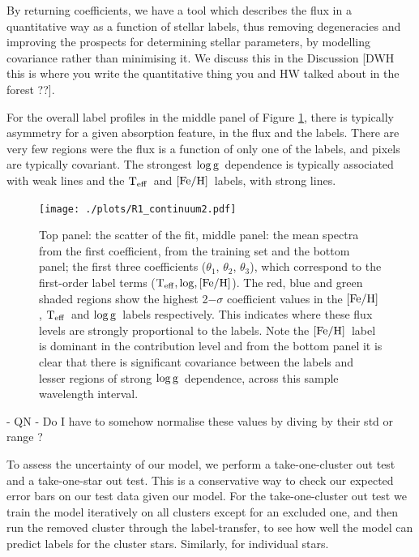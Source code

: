 \documentclass[12pt, preprint]{aastex}
\newcommand{\teff}{\mbox{$\rm T_{eff}$}}
\newcommand{\feh}{\mbox{$\rm [Fe/H]$}}
\newcommand{\logg}{\mbox{$\rm \log g$}}
\begin{document}
By returning coefficients, we have a tool which describes the flux in a quantitative way as a function of stellar labels, thus removing degeneracies and improving the prospects for determining stellar parameters, by modelling covariance rather than minimising it. We discuss this in the Discussion [DWH this is where you write the quantitative thing you and HW talked about in the forest ??].

For the overall label profiles in the middle panel of Figure \ref{fig:coeffs}, there is typically asymmetry for a given absorption feature, in the flux and the labels. There are very few regions were the flux is a function of only one of the labels, and pixels are typically covariant. The strongest \logg\ dependence is typically associated with weak lines and the \teff\ and \feh\ labels, with strong lines. 

 
\begin{figure}[h!]
    \texttt{[image: ./plots/R1\_continuum2.pdf]}
  \caption{Top panel: the scatter of the fit, middle panel: the mean spectra from the first coefficient, from the training set and the bottom panel; the first three coefficients ($\theta_1$, $\theta_2$, $\theta_3$),  which correspond to the first-order label terms ($\teff, \log, \feh$).   The red, blue and green shaded regions show the highest 2$-\sigma$ coefficient values in the \feh, \teff\ and \logg\ labels respectively. This indicates where these flux levels are strongly proportional to the labels. Note the \feh\ label is dominant in the contribution level and from the bottom panel it is clear that there is significant covariance between the labels and lesser regions of strong \logg\ dependence, across this sample wavelength interval.}
\label{fig:coeffs}
\end{figure}
- QN  - Do I have to somehow normalise these values by diving by their std or range ? 


To assess the uncertainty of our model, we perform a take-one-cluster out test and a take-one-star out test. This is a conservative way to check our expected error bars on our test data given our model. For the take-one-cluster out test we train the model iteratively on all clusters except for an excluded one, and then run the removed cluster through the label-transfer, to see how well the model can predict labels for the cluster stars. Similarly, for individual stars.  
\end{document}
